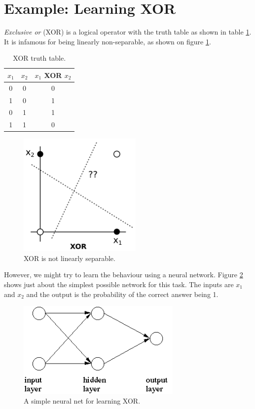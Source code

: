 \documentclass[12pt, a4paper]{article}
\numberwithin{equation}{section}
\begin{document}
\section{Example: Learning XOR}
\textit{Exclusive or} (XOR) is a logical operator with the truth table as shown in table \ref{table:xor}. It is infamous for being linearly non-separable, as shown on figure \ref{fig:xor}. 

\begin{table}
\centering
\begin{tabular}{|c|c|c|}
\hline
$x_1$ & $x_2$ & $x_1$ XOR $x_2$ \\ \hline
0    & 0    & 0             \\ \hline
1    & 0    & 1             \\ \hline
0    & 1    & 1             \\ \hline
1    & 1    & 0             \\ \hline
\end{tabular}
\caption{XOR truth table.}
\label{table:xor}
\end{table}

\begin{figure}
\centering
\includegraphics[width=60mm]{xor}
\caption{XOR is not linearly separable.}
\label{fig:xor}
\end{figure}

However, we might try to learn the behaviour using a neural network. Figure \ref{fig:xor_nn} shows just about the simplest possible network for this task. The inputs are $x_1$ and $x_2$ and the output is the probability of the correct answer being 1.

\begin{figure}
\centering
\includegraphics[width=80mm]{xor_nn}
\caption{A simple neural net for learning XOR.}
\label{fig:xor_nn}
\end{figure}
\end{document}
